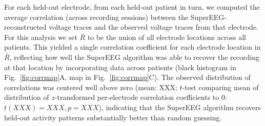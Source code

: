 \documentclass[11pt]{article}
\begin{document}
For each held-out electrode, from each held-out patient in turn, we
computed the average correlation (across recording sessions) between
the SuperEEG-reconstructed voltage traces and the observed voltage
traces from that electrode.  For this analysis we set $\bar{R}$ to be
the union of all electrode locations across all patients.  This
yielded a single correlation coefficient for each electrode location
in $\bar{R}$, reflecting how well the SuperEEG algorithm was able to
recover the recording at that location by incorporating data across
patients (black histogram in Fig.~\ref{fig:corrmap}A, map in
Fig.~\ref{fig:corrmap}C).  The observed distribution of correlations
was centered well above zero (mean: XXX; $t$-test comparing mean of
distribution of $z$-transformed per-electrode correlation coefficients
to 0: $t(XXX) = XXX, p = XXX$), indicating that the SuperEEG algorithm
recovers held-out activity patterns substantially better than random
guessing.
\end{document}

